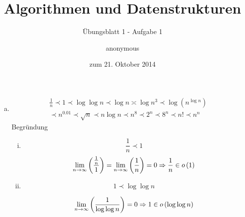 \documentclass[a4paper]{scrartcl}
\title{Algorithmen und Datenstrukturen}
\subtitle{Übungsblatt 1 - Aufgabe 1}
\author{
    anonymous
}
\date{zum 21. Oktober 2014}
\begin{document}
\maketitle

\begin{enumerate}[(a)]
    \item
        \begin{equation}
            \begin{gathered}
                \frac{1}{n}
                \prec
                1
                \prec
                \log \log n
                \prec
                \log n
                \asymp
                \log n^3
                \prec
                \log \left( n^{\log n} \right) \\
                \prec
                n^{\num{0,01}}
                \prec
                \sqrt{n}
                \prec
                n \log n
                \prec
                n^8
                \prec
                2^n
                \prec
                8^n
                \prec
                n!
                \prec
                n^n
            \end{gathered}
        \end{equation}
        Begründung
        \begin{enumerate}[i.]
            \item
                \begin{equation*}
                    \frac{1}{n} \prec 1
                \end{equation*}
                \begin{equation*}
                    \lim_{n \to \infty} \left( \frac{\frac{1}{n}}{1} \right)
                    = \lim_{n \to \infty} \left( \frac{1}{n} \right)
                    = 0 \Rightarrow \frac{1}{n} \in o \left( 1 \right)
                \end{equation*}
                
            \item
                \begin{equation*}
                    1 \prec \log \log n
                \end{equation*}

                \begin{equation*}
                    \lim_{n \to \infty} \left( \frac{1}{\log \log n} \right)
                    = 0 \Rightarrow 1 \in o \left( \log \log n \right)
                \end{equation*}


\end{enumerate}
\end{enumerate}
\end{document}
